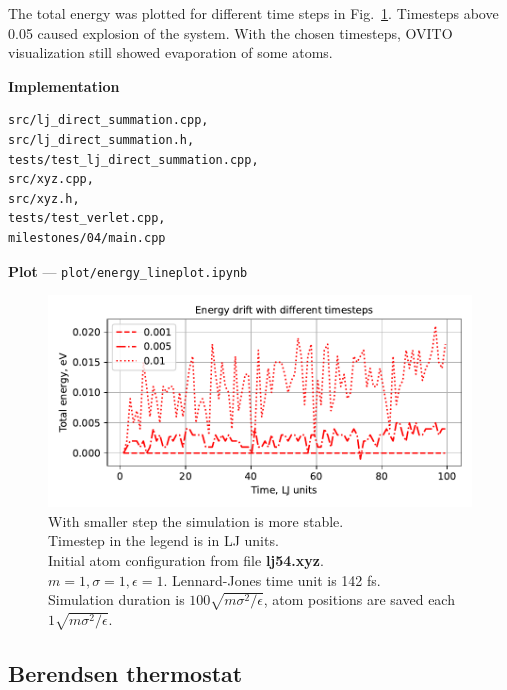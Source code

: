 \documentclass[12pt,a4paper]{article}
\begin{document}
The total energy was plotted for different time steps in Fig.~\ref{fig:first_simulation}. Timesteps above 0.05 caused explosion of the system. With the chosen timesteps, OVITO visualization still showed evaporation of some atoms.

{\bf Implementation}
\begin{lstlisting}[breaklines]
src/lj_direct_summation.cpp, 
src/lj_direct_summation.h,
tests/test_lj_direct_summation.cpp,
src/xyz.cpp,
src/xyz.h,
tests/test_verlet.cpp,
milestones/04/main.cpp
\end{lstlisting}


{\bf Plot} --- \verb|plot/energy_lineplot.ipynb|

\begin{figure}[htb]
	\centering
	\includegraphics[width=.7\linewidth]{img/milestone04-total.pdf}
	\caption{With smaller step the simulation is more stable.\\ Timestep in the legend is in LJ units.\\ Initial atom configuration from file {\bf lj54.xyz}.\\ \( m=1, \sigma=1, \epsilon=1 \). Lennard-Jones time unit is 142 fs.\\ Simulation duration is \( 100 \sqrt{m\sigma^2 / \epsilon} \), atom positions are saved each \( 1 \sqrt{m\sigma^2 / \epsilon} \).}
	\label{fig:first_simulation}
\end{figure}


\subsection*{Berendsen thermostat}
\end{document}
